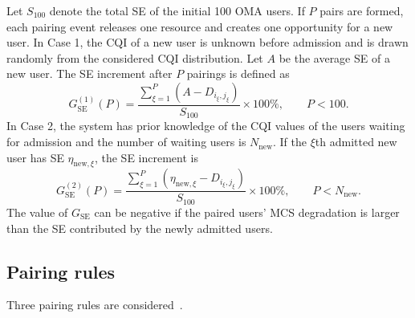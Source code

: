 Let $S_{100}$ denote the total SE of the initial 100 OMA users. If $P$ pairs are formed, each pairing event releases one resource and creates one opportunity for a new user. In Case 1, the CQI of a new user is unknown before admission and is drawn randomly from the considered CQI distribution. Let $A$ be the average SE of a new user. The SE increment after $P$ pairings is defined as
\begin{equation}
    G_{\mathrm{SE}}^{(1)}(P)
    =
    \frac{
    \sum_{\xi=1}^{P}
    \left(A-D_{i_\xi,j_\xi}\right)
    }
    {S_{100}}
    \times 100\%, \qquad P < 100.
    \label{eq:case1-se-increment}
\end{equation}
In Case 2, the system has prior knowledge of the CQI values of the users waiting for admission and the number of waiting users is $N_{\mathrm{new}}$. If the $\xi$th admitted new user has SE $\eta_{\mathrm{new},\xi}$, the SE increment is
\begin{equation}
    G_{\mathrm{SE}}^{(2)}(P)
    =
    \frac{
    \sum_{\xi=1}^{P}
    \left(\eta_{\mathrm{new},\xi}-D_{i_\xi,j_\xi}\right)
    }
    {S_{100}}
    \times 100\%, \qquad P < N_{\mathrm{new}}.
    \label{eq:case2-se-increment}
\end{equation}
The value of $G_{\mathrm{SE}}$ can be negative if the paired users' MCS degradation is larger than the SE contributed by the newly admitted users.

\subsection{Pairing rules}
\label{subsec:pairing-rules}

Three pairing rules are considered~\cite{Chen2015CQI}.


